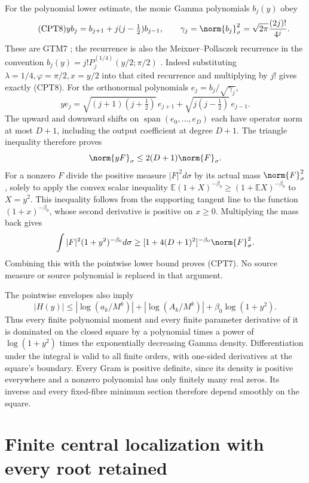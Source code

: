 For the polynomial lower estimate, the monic Gamma polynomials
\(b_j(y)\) obey
\begin{equation}\tag{CPT8}
 yb_j=b_{j+1}+j(j-\tfrac12)b_{j-1},\qquad
 \gamma_j=\norm{b_j}_\sigma^2
 =\sqrt{2\pi}\frac{(2j)!}{4^j}.
\end{equation}
These are GTM7 \cite{cpt:providers}; the recurrence is also the
Meixner--Pollaczek recurrence in the convention
\(b_j(y)=j!P_j^{(1/4)}(y/2;\pi/2)\)
\cite[(18.22.8)]{cpt:dlmfMP}.  Indeed substituting
\(\lambda=1/4,\varphi=\pi/2,x=y/2\) into that cited recurrence and
multiplying by \(j!\) gives exactly (CPT8).
For the orthonormal polynomials \(e_j=b_j/\sqrt{\gamma_j}\),
\[
 ye_j=\sqrt{(j+1)(j+\tfrac12)}\,e_{j+1}
       +\sqrt{j(j-\tfrac12)}\,e_{j-1}.
\]
The upward and downward shifts on
\(\operatorname{span}(e_0,\ldots,e_D)\) each have operator norm at
most \(D+1\), including the output coefficient at degree \(D+1\).
The triangle inequality therefore proves
\[
 \norm{yF}_\sigma\le2(D+1)\norm{F}_\sigma.
\]
For a nonzero \(F\) divide the positive measure
\(|F|^2d\sigma\) by its actual mass \(\norm{F}_\sigma^2\), solely
to apply the convex scalar inequality
\(\mathbb E(1+X)^{-\beta_0}\ge(1+\mathbb EX)^{-\beta_0}\)
to \(X=y^2\).  This inequality follows from the supporting tangent
line to the function \((1+x)^{-\beta_0}\), whose second derivative
is positive on \(x\ge0\).  Multiplying the mass back gives
\[
 \int |F|^2(1+y^2)^{-\beta_0}d\sigma
 \ge[1+4(D+1)^2]^{-\beta_0}\norm{F}_\sigma^2.
\]
Combining this with the pointwise lower bound proves (CPT7).
No source measure or source polynomial is replaced in that argument.

The pointwise envelopes also imply
\[
 |H(y)|\le
 |\log(a_k/M^k)|+|\log(A_k/M^k)|
       +\beta_0\log(1+y^2).
\]
Thus every finite polynomial moment and every finite parameter
derivative of it is dominated on the closed square by a polynomial
times a power of \(\log(1+y^2)\) times the exponentially decreasing
Gamma density.  Differentiation under the integral is valid to all
finite orders, with one-sided derivatives at the square's boundary.
Every Gram is positive definite, since its density is positive
everywhere and a nonzero polynomial has only finitely many real
zeros.  Its inverse and every fixed-fibre minimum section therefore
depend smoothly on the square.

\section{Finite central localization with every root retained}
\label{cpt:sec:localization}

